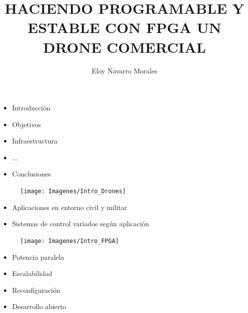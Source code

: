 \documentclass[a4,landscpae]{seminar}
\title{HACIENDO PROGRAMABLE Y ESTABLE CON FPGA UN DRONE COMERCIAL}
\author{Eloy Navarro Morales}
\begin{document}
\maketitle

\begin{hslide}
\begin{itemize}
	\item Introducci\'on
	\item Objetivos
	\item Infraestructura
	\item ...
	\item Conclusiones
\end{itemize}
\end{hslide}



\begin{hslide}
\begin{minipage}{6.1cm}
	\begin{figure}
		\texttt{[image: Imagenes/Intro\_Drones]}
	\end{figure}
\end{minipage} \hfill
\begin{minipage}{4.9cm}
	\begin{itemize}
		\item Aplicaciones en entorno civil y militar
		\item Sistemas de control variados seg\'un aplicaci\'on
	\end{itemize}
\end{minipage}

\end{hslide}
\begin{hslide}
\begin{minipage}{7cm}
	\begin{center}
		\begin{figure}
			\texttt{[image: Imagenes/Intro\_FPGA]}
		\end{figure}
	\end{center}
\end{minipage} \hfill
\begin{minipage}{3.5cm}
	\begin{itemize}
		\item Potencia paralela
		\item Escalabilidad
		\item Reconfiguraci\'on
		\item Desarrollo abierto
	\end{itemize}
\end{minipage}
\end{hslide}
\end{document}

